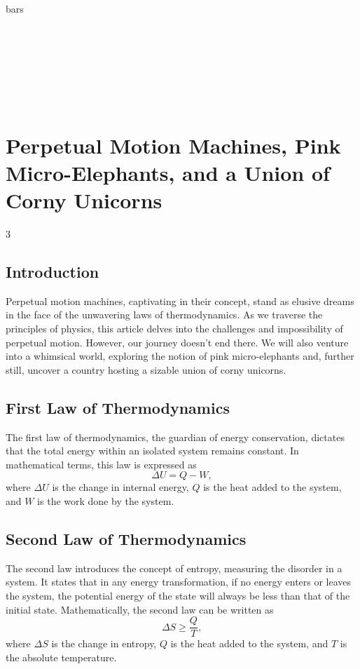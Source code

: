 \documentclass[
  t,%
]{_style/tudelft-beamerposter}
\renewcommand\maketitle{
  {\begin{beamercolorbox}[
    wd=\paperwidth,
  ]{bars}{%
    \centering\robotoslab%
    \vskip0.01\paperheight
    \begin{minipage}{\textwidth-30mm}\centering
      \Huge\inserttitle\\[0.01\paperheight]
      \LARGE\insertsubtitle\\[0.01\paperheight]
      \insertauthor\\[0.01\paperheight]
      \normalsize\insertinstitute\\[0.01\paperheight]
      \Large\insertdate
    \end{minipage}\\
    \vskip0.01\paperheight
  }\end{beamercolorbox}}%
}
\begin{document}
\begin{frame}[fragile]
  \maketitle

  \section{Perpetual Motion Machines, Pink Micro-Elephants, and a Union of Corny Unicorns}
  \smallskip
  \begin{multicols}{3}
    \subsection{Introduction}
    Perpetual motion machines, captivating in their concept, stand as elusive dreams in the face of the unwavering laws of thermodynamics. As we traverse the principles of physics, this article delves into the challenges and impossibility of perpetual motion. However, our journey doesn't end there. We will also venture into a whimsical world, exploring the notion of pink micro-elephants and, further still, uncover a country hosting a sizable union of corny unicorns.

    \subsection{First Law of Thermodynamics}
    The first law of thermodynamics, the guardian of energy conservation, dictates that the total energy within an isolated system remains constant. In mathematical terms, this law is expressed as
    \[\Delta U = Q - W,\]
    where $\Delta U$ is the change in internal energy, $Q$ is the heat added to the system, and $W$ is the work done by the system.

    \subsection{Second Law of Thermodynamics}
    The second law introduces the concept of entropy, measuring the disorder in a system. It states that in any energy transformation, if no energy enters or leaves the system, the potential energy of the state will always be less than that of the initial state. Mathematically, the second law can be written as
    \[\Delta S \geq \frac{Q}{T},\]
    where $\Delta S$ is the change in entropy, $Q$ is the heat added to the system, and $T$ is the absolute temperature.


\end{multicols}
\end{frame}
\end{document}
